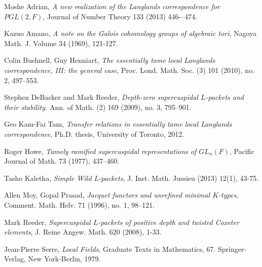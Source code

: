 \documentclass[11pt]{amsart}
\theoremstyle{plain}
\theoremstyle{definition}
\begin{document}
\begin{thebibliography}{9}

  Moshe Adrian,
  \emph{A new realization of the Langlands correspondence for $PGL(2,F)$}, Journal of Number Theory 133 (2013) 446-–474.

  Kazuo Amano,
  \emph{A note on the Galois cohomology groups of algebraic tori}, Nagoya Math. J. Volume 34 (1969), 121-127.

  Colin Bushnell, Guy Henniart,
  \emph{The essentially tame local Langlands correspondence, III: the general case}, Proc. Lond. Math. Soc. (3) 101 (2010), no. 2, 497–553.

  Stephen DeBacker and Mark Reeder,
  \emph{Depth-zero supercuspidal $L$-packets and their stability.}
  Ann. of Math. (2) 169 (2009), no. 3, 795--901.

  Geo Kam-Fai Tam,
  \emph{Transfer relations in essentially tame local Langlands correspondence}, Ph.D. thesis, University of Toronto, 2012.

  Roger Howe,
  \emph{Tamely ramified supercuspidal representations of $GL_n(F)$},
   Pacific Journal of Math.  73  (1977),  437--460.

  Tasho Kaletha, \emph{Simple Wild L-packets}, J. Inst. Math. Jussieu (2013) 12(1), 43-75.

  Allen Moy, Gopal Prasad,
  \emph{Jacquet functors and unrefined minimal $K$-types},
   Comment. Math. Helv. 71 (1996), no. 1, 98--121.

  Mark Reeder,
  \emph{Supercuspidal $L$-packets of positive depth and twisted Coxeter elements},
  J. Reine Angew. Math. 620 (2008), 1-33.

  Jean-Pierre Serre,
  \emph{Local Fields}, Graduate Texts in Mathematics, 67. Springer-Verlag, New York-Berlin, 1979.

\end{thebibliography}
\end{document}
